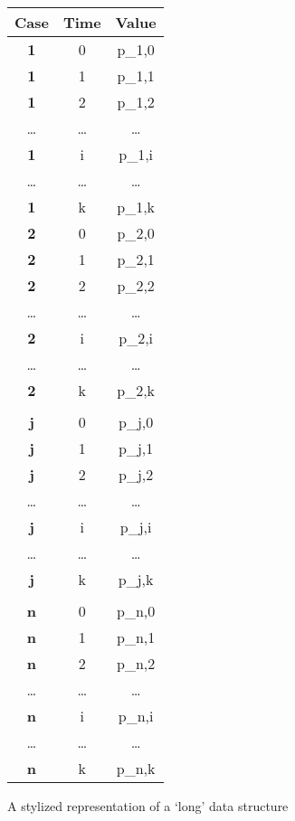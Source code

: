 \documentclass[a4paper,11pt]{book}
\numberwithin{figure}{chapter}
\numberwithin{table}{chapter}
\begin{document}
\begin{figure}[!htbp]
	\centering
	\begin{tabular}{|c|c|c|}
		\hline
		\textbf{Case} & \textbf{Time} & \textbf{Value} \\ \hline
		\textbf{1}    & 0 & p_{1,0}  \\
		\textbf{1}    & 1 & p_{1,1}  \\
 		\textbf{1}    & 2 & p_{1,2}  \\
		\ldots & \ldots & \ldots \\
 		\textbf{1}    & i & p_{1,i}  \\
		\ldots & \ldots & \ldots \\
 		\textbf{1}    & k & p_{1,k}  \\ 
		\textbf{2}    & 0 & p_{2,0}  \\
		\textbf{2}    & 1 & p_{2,1}  \\
 		\textbf{2}    & 2 & p_{2,2}  \\
		\ldots & \ldots & \ldots \\
 		\textbf{2}    & i & p_{2,i}  \\
		\ldots & \ldots & \ldots \\
 		\textbf{2}    & k & p_{2,k}  \\ 
		\multicolumn{3}{c}{}\\
		\textbf{j}    & 0 & p_{j,0}  \\
		\textbf{j}    & 1 & p_{j,1}  \\
 		\textbf{j}    & 2 & p_{j,2}  \\
		\ldots & \ldots & \ldots \\
 		\textbf{j}    & i & p_{j,i}  \\
		\ldots & \ldots & \ldots \\
 		\textbf{j}    & k & p_{j,k}  \\ 
		\multicolumn{3}{c}{}\\
		\textbf{n}    & 0 & p_{n,0}  \\
		\textbf{n}    & 1 & p_{n,1}  \\
 		\textbf{n}    & 2 & p_{n,2}  \\
		\ldots & \ldots & \ldots \\
 		\textbf{n}    & i & p_{n,i}  \\
		\ldots & \ldots & \ldots \\
 		\textbf{n}    & k & p_{n,k}  \\ \hline
	\end{tabular}
	\caption{A stylized representation of a `long' data structure}
	\label{fig:long_dataframe}
\end{figure}
\clearpage
\end{document}
